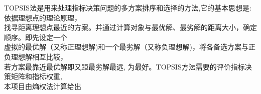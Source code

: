 \documentclass[preview]{standalone}
\begin{document}
\begin{center}
TOPSIS法是用来处理指标决策问题的多方案排序和选择的方法,它的基本思想是:依据理想点的理论原理，\\找寻距离理想点最近的方案。并通过计算对象与最优解、最劣解的距离大小，确定顺序。即先设定一个\\ 虚拟的最优解（又称正理想解)和一个最劣解（又称负理想解)，将各备选方案与正负理想解相互比较，\\若方案最靠近最优解即又距最劣解最远, 为最好。TOPSIS方法需要的评价指标决策矩阵和指标权重,\\本项目由熵权法计算给出
\end{center}
\end{document}
